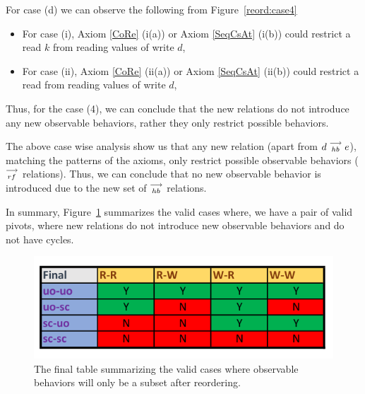     For case (d) we can observe the following from Figure~\ref{reord:case4} 
    \begin{itemize}
        \item For case (i), Axiom \ref{CoRe} (i(a)) or Axiom \ref{SeqCsAt} (i(b)) could restrict a read $k$ from reading values of write $d$, 
        \item For case (ii), Axiom \ref{CoRe} (ii(a)) or Axiom \ref{SeqCsAt} (ii(b)) could restrict a read from reading values of write $d$, 
    \end{itemize}

    Thus, for the case (4), we can conclude that the new relations do not introduce any new observable behaviors, rather they only restrict possible behaviors.
    
    The above case wise analysis show us that any new relation (apart from $d\stackrel{\longrightarrow}{_{hb}}e$), matching the patterns of the axioms, only restrict possible observable behaviors ($\stackrel{\longrightarrow}{_{rf}}$ relations). 
    Thus, we can conclude that no new observable behavior is introduced due to the new set of $\stackrel{\longrightarrow}{_{hb}}$ relations. 
    
    In summary, Figure~\ref{reord:final_table} summarizes the valid cases where, we have a pair of valid pivots, where new relations do not introduce new observable behaviors and do not have cycles. 
    \begin{figure}[H]
        \centering
        \includegraphics[scale=0.7]{4.InstructionReordering/4.ValidReorderingCandidate/part4_table.pdf}
        \caption{The final table summarizing the valid cases where observable behaviors will only be a subset after reordering.}
        \label{reord:final_table}
    \end{figure}
